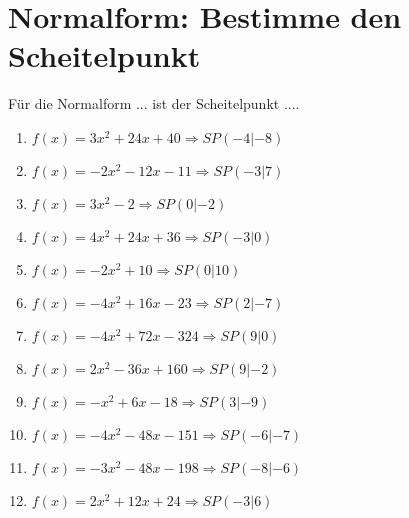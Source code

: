 \documentclass{article}%
\begin{document}
\section{Normalform: Bestimme den Scheitelpunkt}%
\label{sec:NormalformBestimmedenScheitelpunkt}%
Für die Normalform ... ist der Scheitelpunkt ....%
\begin{enumerate}[label=\alph*)]%
\item%
\newline\vspace{0.5cm}$f(x)=3x^2 + 24x + 40 \Rightarrow SP(-4|-8) $%
\item%
\newline\vspace{0.5cm}$f(x)=-2x^2 - 12x - 11 \Rightarrow SP(-3|7) $%
\item%
\newline\vspace{0.5cm}$f(x)=3x^2 - 2 \Rightarrow SP(0|-2) $%
\item%
\newline\vspace{0.5cm}$f(x)=4x^2 + 24x + 36 \Rightarrow SP(-3|0) $%
\item%
\newline\vspace{0.5cm}$f(x)=-2x^2 + 10 \Rightarrow SP(0|10) $%
\item%
\newline\vspace{0.5cm}$f(x)=-4x^2 + 16x - 23 \Rightarrow SP(2|-7) $%
\item%
\newline\vspace{0.5cm}$f(x)=-4x^2 + 72x - 324 \Rightarrow SP(9|0) $%
\item%
\newline\vspace{0.5cm}$f(x)=2x^2 - 36x + 160 \Rightarrow SP(9|-2) $%
\item%
\newline\vspace{0.5cm}$f(x)=-x^2 + 6x - 18 \Rightarrow SP(3|-9) $%
\item%
\newline\vspace{0.5cm}$f(x)=-4x^2 - 48x - 151 \Rightarrow SP(-6|-7) $%
\item%
\newline\vspace{0.5cm}$f(x)=-3x^2 - 48x - 198 \Rightarrow SP(-8|-6) $%
\item%
\newline\vspace{0.5cm}$f(x)=2x^2 + 12x + 24 \Rightarrow SP(-3|6) $%

\end{enumerate}
\end{document}
